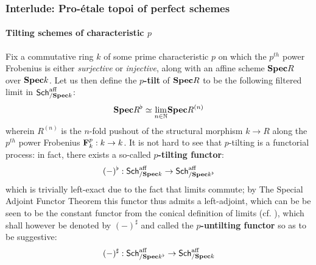             \subsubsection{Interlude: Pro-\'etale topoi of perfect schemes} \label{subsection: pro_etale_topology_for_schemes}
                \paragraph{Tilting schemes of characteristic \texorpdfstring{$p$}{}}
                    \begin{definition} \label{def: tilting_schemes}
                        Fix a commutative ring $k$ of some prime characteristic $p$ on which the $p^{th}$ power Frobenius is either \textit{surjective} or \textit{injective}, along with an affine scheme $\mathbf{Spec} R$ over $\mathbf{Spec} k$. Let us then define the \textbf{$p$-tilt} of $\mathbf{Spec} R$ to be the following filtered limit in $\mathsf{Sch}^{\mathrm{aff}}_{/\mathbf{Spec} k}$:
                            $$\mathbf{Spec} R^{\flat} \simeq \underset{n \in \mathbb{N}}{\operatorname{lim}} \mathbf{Spec} R^{(n)}$$
                        wherein $R^{(n)}$ is the $n$-fold pushout of the structural morphism $k \to R$ along the $p^{th}$ power Frobenius $\mathbf{F}_k^p: k \to k$. It is not hard to see that $p$-tilting is a functorial process: in fact, there exists a so-called \textbf{$p$-tilting functor}:
                            $$(-)^{\flat}: \mathsf{Sch}^{\mathrm{aff}}_{/\mathbf{Spec} k} \to \mathsf{Sch}^{\mathrm{aff}}_{/\mathbf{Spec} k^{\flat}}$$
                        which is trivially left-exact due to the fact that limits commute; by The Special Adjoint Functor Theorem \cite[Theorem V.8.2]{maclane} this functor thus admits a left-adjoint, which can be be seen to be the constant functor from the conical definition of limits (cf. \cite[Section 3]{nlab:limit}), which shall however be denoted by $(-)^{\sharp}$ and called the \textbf{$p$-untilting functor} so as to be suggestive:
                            $$(-)^{\sharp}: \mathsf{Sch}^{\mathrm{aff}}_{/\mathbf{Spec} k^{\flat}} \to \mathsf{Sch}^{\mathrm{aff}}_{/\mathbf{Spec} k}$$
                    \end{definition}
